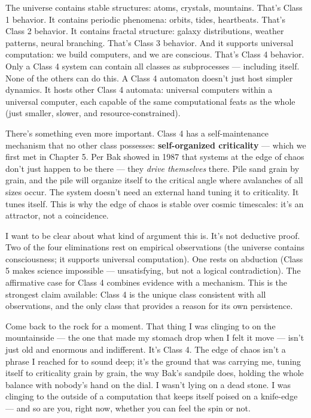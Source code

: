 \documentclass[11pt, twoside, openright]{book}
\begin{document}
The universe contains stable structures: atoms, crystals, mountains. That's Class 1 behavior. It contains periodic phenomena: orbits, tides, heartbeats. That's Class 2 behavior. It contains fractal structure: galaxy distributions, weather patterns, neural branching. That's Class 3 behavior. And it supports universal computation: we build computers, and we are conscious. That's Class 4 behavior. Only a Class 4 system can contain all classes as subprocesses --- including itself. None of the others can do this. A Class 4 automaton doesn't just host simpler dynamics. It hosts other Class 4 automata: universal computers within a universal computer, each capable of the same computational feats as the whole (just smaller, slower, and resource-constrained).

There's something even more important. Class 4 has a self-maintenance mechanism that no other class possesses: \textbf{self-organized criticality} --- which we first met in Chapter 5. Per Bak showed in 1987 that systems at the edge of chaos don't just happen to be there --- they \textit{drive themselves} there. Pile sand grain by grain, and the pile will organize itself to the critical angle where avalanches of all sizes occur. The system doesn't need an external hand tuning it to criticality. It tunes itself. This is why the edge of chaos is stable over cosmic timescales: it's an attractor, not a coincidence.

I want to be clear about what kind of argument this is. It's not deductive proof. Two of the four eliminations rest on empirical observations (the universe contains consciousness; it supports universal computation). One rests on abduction (Class 5 makes science impossible --- unsatisfying, but not a logical contradiction). The affirmative case for Class 4 combines evidence with a mechanism. This is the strongest claim available: Class 4 is the unique class consistent with all observations, and the only class that provides a reason for its own persistence.

Come back to the rock for a moment. That thing I was clinging to on the mountainside --- the one that made my stomach drop when I felt it move --- isn't just old and enormous and indifferent. It's Class 4. The edge of chaos isn't a phrase I reached for to sound deep; it's the ground that was carrying me, tuning itself to criticality grain by grain, the way Bak's sandpile does, holding the whole balance with nobody's hand on the dial. I wasn't lying on a dead stone. I was clinging to the outside of a computation that keeps itself poised on a knife-edge --- and so are you, right now, whether you can feel the spin or not.
\end{document}
